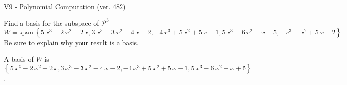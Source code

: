\begin{exercise}
  \begin{exerciseTitle}V9 - Polynomial Computation (ver. 482)\end{exerciseTitle}
  \begin{exerciseStatement}
    Find a basis for the subspace of \(\mathcal{P}^3\) 
\[W=\mathrm{span}\ \left\{5 \, x^{3} - 2 \, x^{2} + 2 \, x , 3 \, x^{3} - 3 \, x^{2} - 4 \, x - 2 , -4 \, x^{3} + 5 \, x^{2} + 5 \, x - 1 , 5 \, x^{3} - 6 \, x^{2} - x + 5 , -x^{3} + x^{2} + 5 \, x - 2\right\}.\]
 Be sure to explain why your result is a basis.


  \end{exerciseStatement}
  \begin{exerciseAnswer}
   A basis of \(W\) is  \(\left\{5 \, x^{3} - 2 \, x^{2} + 2 \, x , 3 \, x^{3} - 3 \, x^{2} - 4 \, x - 2 , -4 \, x^{3} + 5 \, x^{2} + 5 \, x - 1 , 5 \, x^{3} - 6 \, x^{2} - x + 5\right\}\).
  


  \end{exerciseAnswer}
\end{exercise}